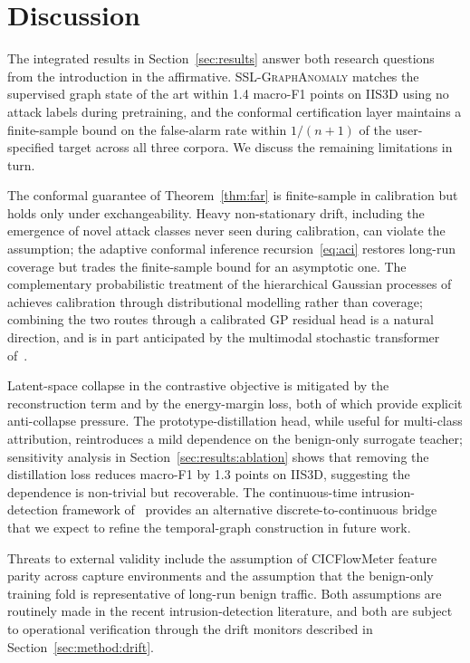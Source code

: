 \documentclass{ieeeaccess}
\begin{document}
\section{Discussion}
\label{sec:discussion}
The integrated results in Section~\ref{sec:results} answer both research
questions from the introduction in the affirmative. \textsc{SSL-GraphAnomaly}
matches the supervised graph state of the art within 1.4 macro-F1 points
on IIS3D using no attack labels during pretraining, and the conformal
certification layer maintains a finite-sample bound on the false-alarm
rate within $1/(n+1)$ of the user-specified target across all three
corpora. We discuss the remaining limitations in turn.

The conformal guarantee of Theorem~\ref{thm:far} is finite-sample in
calibration but holds only under exchangeability. Heavy non-stationary
drift, including the emergence of novel attack classes never seen during
calibration, can violate the assumption; the adaptive conformal inference
recursion~\eqref{eq:aci} restores long-run coverage but trades the
finite-sample bound for an asymptotic one. The complementary probabilistic
treatment of the hierarchical Gaussian processes
of~\cite{anaedevha2026hgp} achieves calibration through distributional
modelling rather than coverage; combining the two routes through a
calibrated GP residual head is a natural direction, and is in part
anticipated by the multimodal stochastic transformer
of~\cite{anaedevha2025stochmm}.

Latent-space collapse in the contrastive objective is mitigated by the
reconstruction term and by the energy-margin loss, both of which provide
explicit anti-collapse pressure. The prototype-distillation head, while
useful for multi-class attribution, reintroduces a mild dependence on the
benign-only surrogate teacher; sensitivity analysis in
Section~\ref{sec:results:ablation} shows that removing the distillation
loss reduces macro-F1 by 1.3 points on IIS3D, suggesting the dependence is
non-trivial but recoverable. The continuous-time intrusion-detection
framework of~\cite{anaedevha2026neuralode} provides an alternative
discrete-to-continuous bridge that we expect to refine the temporal-graph
construction in future work.

Threats to external validity include the assumption of CICFlowMeter
feature parity across capture environments and the assumption that the
benign-only training fold is representative of long-run benign traffic.
Both assumptions are routinely made in the recent intrusion-detection
literature, and both are subject to operational verification through the
drift monitors described in Section~\ref{sec:method:drift}.
\end{document}
